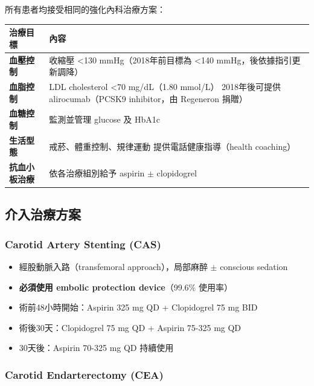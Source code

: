 \documentclass[12pt,a4paper]{article}
\begin{document}
所有患者均接受相同的強化內科治療方案：

\begin{longtable}{p{4cm}p{10cm}}
\toprule
\textbf{治療目標} & \textbf{內容} \\
\midrule
\endfirsthead

\bottomrule
\endfoot

\textbf{血壓控制} & 收縮壓 <130 mmHg（2018年前目標為 <140 mmHg，後依據指引更新調降） \\
\midrule
\textbf{血脂控制} & LDL cholesterol <70 mg/dL（1.80 mmol/L）\newline
2018年後可提供 alirocumab（PCSK9 inhibitor，由 Regeneron 捐贈） \\
\midrule
\textbf{血糖控制} & 監測並管理 glucose 及 HbA1c \\
\midrule
\textbf{生活型態} & 戒菸、體重控制、規律運動\newline
提供電話健康指導（health coaching） \\
\midrule
\textbf{抗血小板治療} & 依各治療組別給予 aspirin $\pm$ clopidogrel \\
\bottomrule
\end{longtable}

\subsection{介入治療方案}

\subsubsection{Carotid Artery Stenting (CAS)}

\begin{itemize}
    \item 經股動脈入路（transfemoral approach），局部麻醉 $\pm$ conscious sedation
    \item \textbf{必須使用 embolic protection device}（99.6\% 使用率）
    \item 術前48小時開始：Aspirin 325 mg QD + Clopidogrel 75 mg BID
    \item 術後30天：Clopidogrel 75 mg QD + Aspirin 75-325 mg QD
    \item 30天後：Aspirin 70-325 mg QD 持續使用
\end{itemize}

\subsubsection{Carotid Endarterectomy (CEA)}
\end{document}
